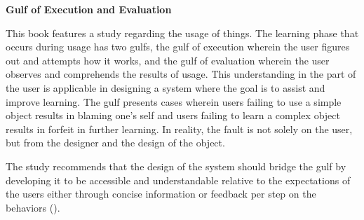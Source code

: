 \flushleft
\textbf{Gulf of Execution and Evaluation}\\
\justifying

\parx
This book features a study regarding the usage of things. The learning phase that occurs
during usage has two gulfs, the gulf of execution wherein the user figures out and
attempts how it works, and the gulf of evaluation wherein the user observes and
comprehends the results of usage. This understanding in the part of the user is
applicable in designing a system where the goal is to assist and improve learning.
The gulf presents cases wherein users failing to use a simple object results in
blaming one's self and users failing to learn a complex object results in forfeit in
further learning. In reality, the fault is not solely on the user, but from the
designer and the design of the object.

\parx
The study recommends that the design of the system should bridge the gulf by developing
it to be accessible and understandable relative to the expectations of the users either
through concise information or feedback per step on the behaviors
(\cite{norman_2013}).
